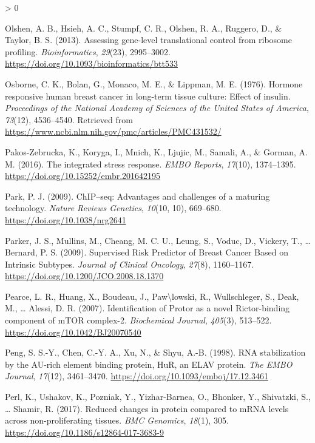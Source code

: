 \documentclass[
  12pt,
  openany]{book}
\newlength{\cslhangindent}
\newenvironment{CSLReferences}[2] %
 {%
  \setlength{\parindent}{0pt}
  \ifodd #1 \everypar{\setlength{\hangindent}{\cslhangindent}}\ignorespaces\fi
  \ifnum #2 > 0
  \setlength{\parskip}{#2\baselineskip}
  \fi
 }%
 {}
\begin{document}
\begin{CSLReferences}{1}{0}
\leavevmode\hypertarget{ref-Olshen2013}{}%
Olshen, A. B., Hsieh, A. C., Stumpf, C. R., Olshen, R. A., Ruggero, D., \& Taylor, B. S. (2013). Assessing gene-level translational control from ribosome profiling. \emph{Bioinformatics}, \emph{29}(23), 2995--3002. \url{https://doi.org/10.1093/bioinformatics/btt533}

\leavevmode\hypertarget{ref-Osborne1976}{}%
Osborne, C. K., Bolan, G., Monaco, M. E., \& Lippman, M. E. (1976). Hormone responsive human breast cancer in long-term tissue culture: Effect of insulin. \emph{Proceedings of the National Academy of Sciences of the United States of America}, \emph{73}(12), 4536--4540. Retrieved from \url{https://www.ncbi.nlm.nih.gov/pmc/articles/PMC431532/}

\leavevmode\hypertarget{ref-Pakos-Zebrucka2016}{}%
Pakos-Zebrucka, K., Koryga, I., Mnich, K., Ljujic, M., Samali, A., \& Gorman, A. M. (2016). The integrated stress response. \emph{EMBO Reports}, \emph{17}(10), 1374--1395. \url{https://doi.org/10.15252/embr.201642195}

\leavevmode\hypertarget{ref-Park2009}{}%
Park, P. J. (2009). {ChIP}--seq: Advantages and challenges of a maturing technology. \emph{Nature Reviews Genetics}, \emph{10}(10, 10), 669--680. \url{https://doi.org/10.1038/nrg2641}

\leavevmode\hypertarget{ref-Parker2009}{}%
Parker, J. S., Mullins, M., Cheang, M. C. U., Leung, S., Voduc, D., Vickery, T., \ldots{} Bernard, P. S. (2009). Supervised {Risk Predictor} of {Breast Cancer Based} on {Intrinsic Subtypes}. \emph{Journal of Clinical Oncology}, \emph{27}(8), 1160--1167. \url{https://doi.org/10.1200/JCO.2008.18.1370}

\leavevmode\hypertarget{ref-Pearce2007}{}%
Pearce, L. R., Huang, X., Boudeau, J., Paw\textbackslash lowski, R., Wullschleger, S., Deak, M., \ldots{} Alessi, D. R. (2007). Identification of {Protor} as a novel {Rictor}-binding component of {mTOR} complex-2. \emph{Biochemical Journal}, \emph{405}(3), 513--522. \url{https://doi.org/10.1042/BJ20070540}

\leavevmode\hypertarget{ref-Peng1998}{}%
Peng, S. S.-Y., Chen, C.-Y. A., Xu, N., \& Shyu, A.-B. (1998). {RNA} stabilization by the {AU}-rich element binding protein, {HuR}, an {ELAV} protein. \emph{The EMBO Journal}, \emph{17}(12), 3461--3470. \url{https://doi.org/10.1093/emboj/17.12.3461}

\leavevmode\hypertarget{ref-Perl2017}{}%
Perl, K., Ushakov, K., Pozniak, Y., Yizhar-Barnea, O., Bhonker, Y., Shivatzki, S., \ldots{} Shamir, R. (2017). Reduced changes in protein compared to {mRNA} levels across non-proliferating tissues. \emph{BMC Genomics}, \emph{18}(1), 305. \url{https://doi.org/10.1186/s12864-017-3683-9}


\end{CSLReferences}
\end{document}
